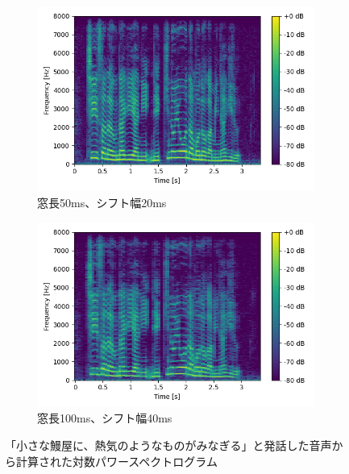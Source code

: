 \documentclass[12pt]{jarticle}
\numberwithin{equation}{section}    %
\numberwithin{figure}{section}      %
\numberwithin{table}{section}      %
\begin{document}
\begin{figure}[tb]
    \begin{subfigure}[b]{0.48\textwidth}
        \centering
        \includegraphics[width=\textwidth]{./figure/sec2/spectrogram_4.png}
        \caption{窓長50ms、シフト幅20ms}
        \label{sec2:fig:spectrogram3}
    \end{subfigure}
    \begin{subfigure}[b]{0.48\textwidth}
        \centering
        \includegraphics[width=\textwidth]{./figure/sec2/spectrogram_8.png}
        \caption{窓長100ms、シフト幅40ms}
        \label{sec2:fig:spectrogram4}
    \end{subfigure}
    \caption{「小さな鰻屋に、熱気のようなものがみなぎる」と発話した音声から計算された対数パワースペクトログラム}
    \label{sec2:fig:log_power_spectrograms}
\end{figure}
\end{document}
